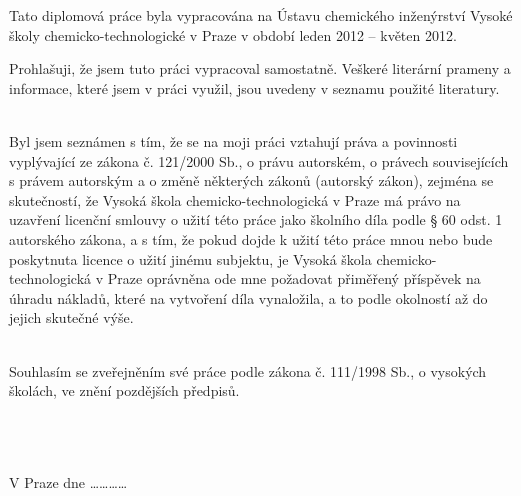 \noindent Tato diplomová práce byla vypracována na Ústavu chemického inženýrství Vysoké školy chemicko-technologické v Praze v období leden 2012 -- květen 2012.

\vspace{11cm}
\noindent Prohlašuji, že jsem tuto práci vypracoval samostatně. Veškeré literární prameny a informace, které jsem v práci využil, jsou uvedeny v seznamu použité literatury.

~\\
\noindent Byl jsem seznámen s tím, že se na moji práci vztahují práva a povinnosti vyplývající ze zákona č. 121/2000 Sb., o právu autorském, o právech souvisejících s právem autorským a o změně některých zákonů (autorský zákon), zejména se skutečností, že Vysoká škola chemicko-technologická v Praze má právo na uzavření licenční smlouvy o užití této práce jako školního díla podle § 60 odst. 1 autorského zákona, a s tím, že pokud dojde k užití této práce mnou nebo bude poskytnuta licence o užití jinému subjektu, je Vysoká škola chemicko-technologická v Praze oprávněna ode mne požadovat přiměřený příspěvek na úhradu nákladů, které na vytvoření díla vynaložila, a to podle okolností až do jejich skutečné výše.

~\\
\noindent Souhlasím se zveřejněním své práce podle zákona č. 111/1998 Sb., o vysokých školách, ve znění pozdějších předpisů.

~\\
~\\
~\\
\noindent V Praze dne \ldots\ldots\ldots\ldots

